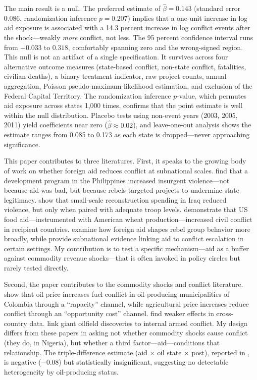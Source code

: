 \documentclass[12pt]{article}
\begin{document}
The main result is a null. The preferred estimate of $\hat{\beta} = 0.143$ (standard error 0.086, randomization inference $p = 0.207$) implies that a one-unit increase in log aid exposure is associated with a 14.3 percent increase in log conflict events after the shock---weakly \emph{more} conflict, not less. The 95 percent confidence interval runs from $-0.033$ to $0.318$, comfortably spanning zero and the wrong-signed region. This null is not an artifact of a single specification. It survives across four alternative outcome measures (state-based conflict, non-state conflict, fatalities, civilian deaths), a binary treatment indicator, raw project counts, annual aggregation, Poisson pseudo-maximum-likelihood estimation, and exclusion of the Federal Capital Territory. The randomization inference $p$-value, which permutes aid exposure across states 1,000 times, confirms that the point estimate is well within the null distribution. Placebo tests using non-event years (2003, 2005, 2011) yield coefficients near zero ($\hat{\beta} \approx 0.02$), and leave-one-out analysis shows the estimate ranges from 0.085 to 0.173 as each state is dropped---never approaching significance.

This paper contributes to three literatures. First, it speaks to the growing body of work on whether foreign aid reduces conflict at subnational scales. \citet{crost2014aid} find that a development program in the Philippines increased insurgent violence---not because aid was bad, but because rebels targeted projects to undermine state legitimacy. \citet{berman2011can} show that small-scale reconstruction spending in Iraq reduced violence, but only when paired with adequate troop levels. \citet{nunn2014us} demonstrate that US food aid---instrumented with American wheat production---increased civil conflict in recipient countries. \citet{blair2023foreign} examine how foreign aid shapes rebel group behavior more broadly, while \citet{gehring2022aid} provide subnational evidence linking aid to conflict escalation in certain settings. My contribution is to test a specific mechanism---aid as a buffer against commodity revenue shocks---that is often invoked in policy circles but rarely tested directly.

Second, the paper contributes to the commodity shocks and conflict literature. \citet{dube2013commodity} show that oil price increases fuel conflict in oil-producing municipalities of Colombia through a ``rapacity'' channel, while agricultural price increases reduce conflict through an ``opportunity cost'' channel. \citet{bazzi2014economic} find weaker effects in cross-country data. \citet{lei2014oil} link giant oilfield discoveries to internal armed conflict. My design differs from these papers in asking not whether commodity shocks cause conflict (they do, in Nigeria), but whether a third factor---aid---conditions that relationship. The triple-difference estimate (aid $\times$ oil state $\times$ post), reported in , is negative ($-$0.08) but statistically insignificant, suggesting no detectable heterogeneity by oil-producing status.
\end{document}
